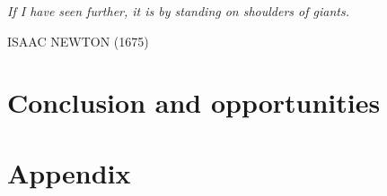 \documentclass[twoside,openright,titlepage,numbers=noenddot,headinclude,%
               footinclude=true,cleardoublepage=empty,abstractoff,BCOR=5mm,%
               paper=a4,fontsize=11pt,english]{scrreprt}
\numberwithin{theorem}{chapter}
\numberwithin{definition}{chapter}
\numberwithin{algorithm}{chapter}
\numberwithin{figure}{chapter}
\numberwithin{table}{chapter}
\numberwithin{equation}{chapter}
\begin{document}
\null\vfill

{\centering
\parbox{\textwidth}{%
  \raggedright{\huge\itshape%
   If I have seen further, it is by standing on shoulders of giants.\par\bigskip
  }
  \raggedleft\Large\MakeUppercase{Isaac Newton (1675)}\par%
}}

\vfill\vfill

\cleardoublepage
\cleardoublepage

\cleardoublepage
\makeatletter
\def\toclevel@chapter{-1}
\makeatother

\part{Conclusion and opportunities}\label{part:2}



\appendix
\cleardoublepage
\part{Appendix}

\cleardoublepage
\cleardoublepage
\end{document}
